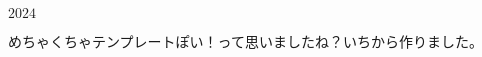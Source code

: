 \documentclass{ltjsarticle}
\begin{document}
\begin{center}
    {\fontsize{50pt}{60pt} }
    \vspace{0.3cm}
    {\fontsize{42pt}{45pt} $2024$}
    \vspace{0.6cm}
    {\fontsize{200pt}{240pt} }
    \vspace{0.6cm}
  \end{center}
めちゃくちゃテンプレートぽい！って思いましたね？いちから作りました。
\end{document}
